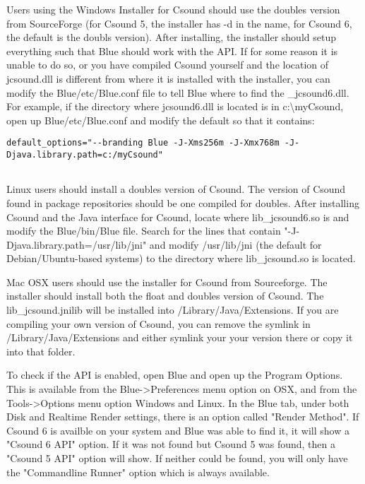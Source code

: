 Users using the Windows Installer for Csound should use the doubles
version from SourceForge (for Csound 5, the installer has -d in the
name, for Csound 6, the default is the doubls version). After
installing, the installer should setup everything such that Blue should
work with the API. If for some reason it is unable to do so, or you have
compiled Csound yourself and the location of jcsound.dll is different
from where it is installed with the installer, you can modify the
Blue/etc/Blue.conf file to tell Blue where to find the \_jcsound6.dll.
For example, if the directory where jcsound6.dll is located is in
c:\textbackslash{}myCsound, open up Blue/etc/Blue.conf and modify the
default so that it contains:

\begin{verbatim}
default_options="--branding Blue -J-Xms256m -J-Xmx768m -J-Djava.library.path=c:/myCsound"
        
\end{verbatim}

Linux users should install a doubles version of Csound. The version of
Csound found in package repositories should be one compiled for doubles.
After installing Csound and the Java interface for Csound, locate where
lib\_jcsound6.so is and modify the Blue/bin/Blue file. Search for the
lines that contain "-J-Djava.library.path=/usr/lib/jni" and modify
/usr/lib/jni (the default for Debian/Ubuntu-based systems) to the
directory where lib\_jcsound.so is located.

Mac OSX users should use the installer for Csound from Sourceforge. The
installer should install both the float and doubles version of Csound.
The lib\_jcsound.jnilib will be installed into /Library/Java/Extensions.
If you are compiling your own version of Csound, you can remove the
symlink in /Library/Java/Extensions and either symlink your your version
there or copy it into that folder.

To check if the API is enabled, open Blue and open up the Program
Options. This is available from the Blue-\textgreater{}Preferences menu
option on OSX, and from the Tools-\textgreater{}Options menu option
Windows and Linux. In the Blue tab, under both Disk and Realtime Render
settings, there is an option called "Render Method". If Csound 6 is
availble on your system and Blue was able to find it, it will show a
"Csound 6 API" option. If it was not found but Csound 5 was found, then
a "Csound 5 API" option will show. If neither could be found, you will
only have the "Commandline Runner" option which is always available.
